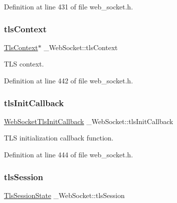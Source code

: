 Definition at line 431 of file web\+\_\+socket.\+h.

\mbox{\label{struct__WebSocket_aae1c65b4608ce3af80ba611c21f0b4bb}} 
\subsubsection{\texorpdfstring{tls\+Context}{tlsContext}}
{\footnotesize\ttfamily \hyperlink{tls_8h_ac09f7a286c0cdf9b07ee1edd107946f5}{Tls\+Context}$\ast$ \+\_\+\+Web\+Socket\+::tls\+Context}



T\+LS context. 



Definition at line 442 of file web\+\_\+socket.\+h.

\mbox{\label{struct__WebSocket_a9f8b2ca6354bce4c6c5013ed6f5df2f8}} 
\subsubsection{\texorpdfstring{tls\+Init\+Callback}{tlsInitCallback}}
{\footnotesize\ttfamily \hyperlink{web__socket_8h_ac1d28db340b5ef55a4a7e5e276018cf4}{Web\+Socket\+Tls\+Init\+Callback} \+\_\+\+Web\+Socket\+::tls\+Init\+Callback}



T\+LS initialization callback function. 



Definition at line 444 of file web\+\_\+socket.\+h.

\mbox{\label{struct__WebSocket_aa72f13b6ae08ed38217d894ccb6ada6d}} 
\subsubsection{\texorpdfstring{tls\+Session}{tlsSession}}
{\footnotesize\ttfamily \hyperlink{structTlsSessionState}{Tls\+Session\+State} \+\_\+\+Web\+Socket\+::tls\+Session}



